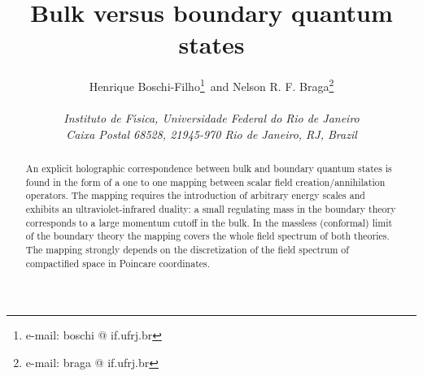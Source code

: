 \documentclass[a4paper,12pt]{article}
\begin{document}
\baselineskip=20pt

\title{Bulk versus boundary quantum states}


\author{\large Henrique Boschi-Filho\footnote{\noindent e-mail: 
boschi @ if.ufrj.br}\,  
and 
Nelson R. F. Braga\footnote{\noindent e-mail: braga @ if.ufrj.br}
\\ 
\\ 
\it Instituto de F\'\i sica, Universidade Federal do Rio de Janeiro\\
\it Caixa Postal 68528, 21945-970  Rio de Janeiro, RJ, Brazil}
 
\date{}

\maketitle

\vskip 3cm


\begin{abstract}


An explicit holographic correspondence between \coordHE{} bulk and boundary quantum states 
is found in the form of a one to one mapping between scalar field
creation/annihilation operators.
The mapping requires the introduction of arbitrary energy scales and
exhibits an ultraviolet-infrared duality: a small regulating 
mass in the boundary theory corresponds to a large momentum cutoff in the bulk.
In the massless (conformal) limit of the boundary theory the mapping covers the whole 
field spectrum of both theories.
The mapping strongly depends on the discretization of the field spectrum of
compactified \coordHE{} space in Poincare coordinates. 

\end{abstract}



\vfill\eject
\end{document}
